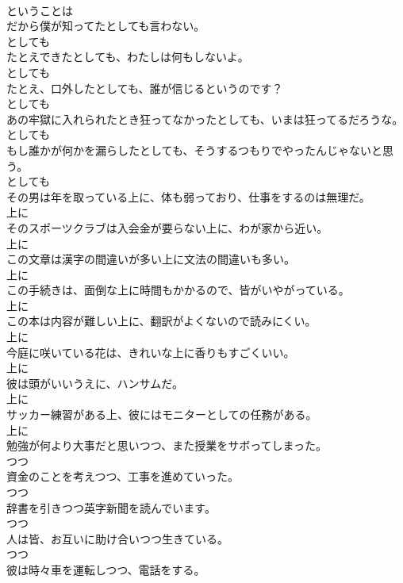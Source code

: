 \documentclass[8pt]{extreport}
\begin{document}
\begin{CJK}{UTF8}{min}
\\	ということは	
\\	だから僕が知ってたとしても言わない。	
\\	としても	
\\	たとえできたとしても、わたしは何もしないよ。	
\\	としても	
\\	たとえ、口外したとしても、誰が信じるというのです？	
\\	としても	
\\	あの牢獄に入れられたとき狂ってなかったとしても、いまは狂ってるだろうな。	
\\	としても	
\\	もし誰かが何かを漏らしたとしても、そうするつもりでやったんじゃないと思う。	
\\	としても	
\\	その男は年を取っている上に、体も弱っており、仕事をするのは無理だ。	
\\	上に	
\\	そのスポーツクラブは入会金が要らない上に、わが家から近い。	
\\	上に	
\\	この文章は漢字の間違いが多い上に文法の間違いも多い。	
\\	上に	
\\	この手続きは、面倒な上に時間もかかるので、皆がいやがっている。	
\\	上に	
\\	この本は内容が難しい上に、翻訳がよくないので読みにくい。	
\\	上に	
\\	今庭に咲いている花は、きれいな上に香りもすごくいい。	
\\	上に	
\\	彼は頭がいいうえに、ハンサムだ。	
\\	上に	
\\	サッカー練習がある上、彼にはモニターとしての任務がある。	
\\	上に	
\\	勉強が何より大事だと思いつつ、また授業をサボってしまった。	
\\	つつ	
\\	資金のことを考えつつ、工事を進めていった。	
\\	つつ	
\\	辞書を引きつつ英字新聞を読んでいます。	
\\	つつ	
\\	人は皆、お互いに助け合いつつ生きている。	
\\	つつ	
\\	彼は時々車を運転しつつ、電話をする。	

\end{CJK}
\end{document}
